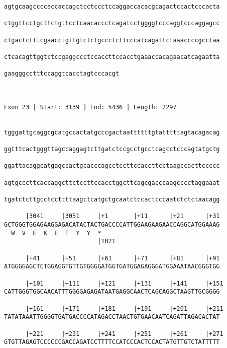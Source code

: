 \documentclass{article}
\begin{document}
\begin{Verbatim}
agtgcaagccccaccaccagctcctccctccaggaccacacgcagactccactcccacta
                                                            
ctggttcctgcttctgttcctcaacaccctcagatcctggggtcccaggtcccaggagcc
                                                            
ctgactctttcgaacctgttgtctctgccctcttcccatcagattctaaaccccgcctaa
                                                            
ctcacagttggtctccgaggccctccaccttccacctgaaaccacagaacatcagaatta
                                                            
gaagggcctttccaggtcacctagtcccacgt
                                
                                
 
Exon 23 | Start: 3139 | End: 5436 | Length: 2297


tgggattgcaggcgcatgccactatgcccgactaattttttgtatttttagtacagacag
                                                            
ggtttcactgggttagccaggagtcttgatctccgcctgcctcagcctcccagtatgctg
                                                            
ggattacaggcatgagccactgcacccagcctccttccaccttcctaagccacttccccc
                                                            
agtgcccttcaccaggcttctccttccacctggcttcagcgacccaagcccctaggaaat
                                                            
tgatctcttgcctccttttaagctcatgctgcaatctccactcccaatctctctaacagg
                                                            
      |3041     |3051     |+1       |+11      |+21      |+31
GCTGGGTGGAGAAGGAGACATACTACTGACCCCATTGGAAGAAGAACCAGGCATGGAAAG
  W  V  E  K  E  T  Y  Y  *                                 
                          |1021
  
      |+41      |+51      |+61      |+71      |+81      |+91
ATGGGGAGCTCTGGAGGTGTTGTGGGGATGGTGATGGAGAGGGATGGAAATAACGGGTGG

      |+101     |+111     |+121     |+131     |+141     |+151
CATTGGGTGGCAACATTTGGGGAGAGATAATGAGGCAACTCAGCAGGCTAAGTTGCGGGG

      |+161     |+171     |+181     |+191     |+201     |+211
TATATAAATTGGGGTGATGACCCCATAGACCTAACTGTGAACAATCAGATTAGACACTAT

      |+221     |+231     |+241     |+251     |+261     |+271
GTGTTAGAGTCCCCCCGACCAGATCCTTTTCCATCCCACTCCACTATGTTGTCTATTTTT


\end{Verbatim}
\end{document}
